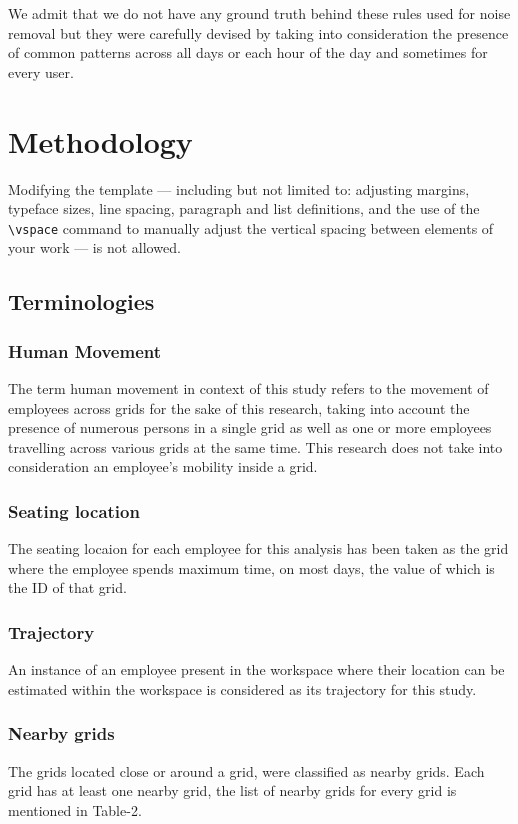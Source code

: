 \documentclass[acmtog]{acmart}
\begin{document}
We admit that we do not have any ground truth behind these rules used for noise removal but they were carefully devised by taking into consideration the presence of common patterns across all days or each hour of the day and sometimes for every user.




\section{Methodology}

Modifying the template --- including but not limited to: adjusting
margins, typeface sizes, line spacing, paragraph and list definitions,
and the use of the \verb|\vspace| command to manually adjust the
vertical spacing between elements of your work --- is not allowed.

\subsection{Terminologies}
\subsubsection{Human Movement}
The term human movement in context of this study refers to the movement of employees across grids for the sake of this research, taking into account the presence of numerous persons in a single grid as well as one or more employees travelling across various grids at the same time. This research does not take into consideration an employee's mobility inside a grid.

\subsubsection{Seating location} The seating locaion for each employee for this analysis has been taken as the grid where the employee spends maximum time, on most days, the value of which is the ID of that grid.

\subsubsection{Trajectory} An instance of an employee present in the workspace where their location can be estimated within the workspace is considered as its trajectory for this study. 

\subsubsection{Nearby grids} The grids located close or around a grid, were classified as nearby grids. Each grid has at least one nearby grid, the list of nearby grids for every grid is mentioned in Table-2. 
\end{document}
